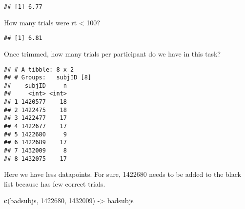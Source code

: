 \documentclass[
]{article}
\newenvironment{Shaded}{\begin{snugshade}}{\end{snugshade}}
\newcommand{\DecValTok}[1]{\textcolor[rgb]{0.00,0.00,0.81}{#1}}
\newcommand{\KeywordTok}[1]{\textcolor[rgb]{0.13,0.29,0.53}{\textbf{#1}}}
\newcommand{\NormalTok}[1]{#1}
\newcommand{\OperatorTok}[1]{\textcolor[rgb]{0.81,0.36,0.00}{\textbf{#1}}}
\newcommand{\StringTok}[1]{\textcolor[rgb]{0.31,0.60,0.02}{#1}}
\begin{document}
\begin{verbatim}
## [1] 6.77
\end{verbatim}

How many trials were rt \textless{} 100?

\begin{Shaded}
\end{Shaded}

\begin{verbatim}
## [1] 6.81
\end{verbatim}

Once trimmed, how many trials per participant do we have in this task?

\begin{Shaded}
\end{Shaded}

\begin{verbatim}
## # A tibble: 8 x 2
## # Groups:   subjID [8]
##    subjID     n
##     <int> <int>
## 1 1420577    18
## 2 1422475    18
## 3 1422477    17
## 4 1422677    17
## 5 1422680     9
## 6 1422689    17
## 7 1432009     8
## 8 1432075    17
\end{verbatim}

Here we have less datapoints. For sure, 1422680 needs to be added to the
black list because has few correct trials.

\begin{Shaded}
\begin{Highlighting}[]
\KeywordTok{c}\NormalTok{(badsubjs, }\DecValTok{1422680}\NormalTok{, }\DecValTok{1432009}\NormalTok{) ->}\StringTok{ }\NormalTok{badsubjs}
\end{Highlighting}
\end{Shaded}
\end{document}
